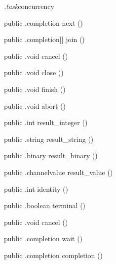 \begin{CrexxClass}{\textit{.task}}{concurrency}
\begin{Members}
    \Method
      {public}
      {.completion}
      {next}
      {()}

    \Method
      {public}
      {.completion[]}
      {join}
      {()}

    \Method
      {public}
      {.void}
      {cancel}
      {()}

    \Method
      {public}
      {.void}
      {close}
      {()}

    \Method
      {public}
      {.void}
      {finish}
      {()}

    \Method
      {public}
      {.void}
      {abort}
      {()}

    \Method
      {public}
      {.int}
      {result\_integer}
      {()}

    \Method
      {public}
      {.string}
      {result\_string}
      {()}

    \Method
      {public}
      {.binary}
      {result\_binary}
      {()}

    \Method
      {public}
      {.channelvalue}
      {result\_value}
      {()}

    \Method
      {public}
      {.int}
      {identity}
      {()}

    \Method
      {public}
      {.boolean}
      {terminal}
      {()}

    \Method
      {public}
      {.void}
      {cancel}
      {()}

    \Method
      {public}
      {.completion}
      {wait}
      {()}

    \Method
      {public}
      {.completion}
      {completion}
      {()}

  \end{Members}
\end{CrexxClass}

